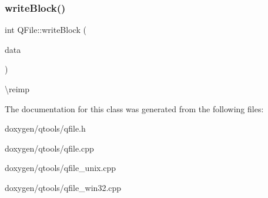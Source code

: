 \subsubsection{\texorpdfstring{writeBlock()}{writeBlock()}\hspace{0.1cm}{\footnotesize\ttfamily [2/2]}}
{\footnotesize\ttfamily int Q\+File\+::write\+Block (\begin{DoxyParamCaption}\item[{const \mbox{\hyperlink{class_q_array}{Q\+Byte\+Array}} \&}]{data }\end{DoxyParamCaption})\hspace{0.3cm}{\ttfamily [inline]}}

\textbackslash{}reimp 

The documentation for this class was generated from the following files\+:\begin{DoxyCompactItemize}
\item 
doxygen/qtools/qfile.\+h\item 
doxygen/qtools/qfile.\+cpp\item 
doxygen/qtools/qfile\+\_\+unix.\+cpp\item 
doxygen/qtools/qfile\+\_\+win32.\+cpp\end{DoxyCompactItemize}
